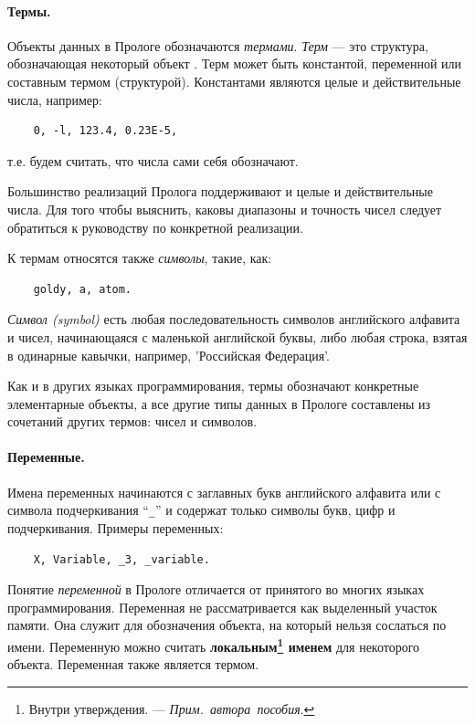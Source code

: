 \documentclass[12pt, openany, twoside]{book} %
\def\AR{{\em Прим.~автора~пособия}}
\begin{document}
\paragraph{Термы.}
Объекты данных в Прологе обозначаются \emph{термами}. {\em Терм} --- это структура, обозначающая некоторый объект  \cite{DDW}. Терм может быть константой, переменной или составным термом (структурой). Константами являются целые и действительные числа, например:
{\tt\begin{verbatim}
    0, -l, 123.4, 0.23E-5,
\end{verbatim}}
\noindent т.е. будем считать, что числа сами себя обозначают.

Большинство реализаций Пролога поддерживают и целые и действительные числа. Для того чтобы выяснить, каковы диапазоны и точность чисел следует обратиться к руководству по конкретной реализации.

К термам относятся также \emph{символы}, такие, как:
{\tt\begin{verbatim}
    goldy, а, atom.
\end{verbatim}}

{\em Символ (symbol)} есть любая последовательность символов английского алфавита и чисел, начинающаяся с маленькой английской буквы, либо любая строка, взятая в одинарные кавычки, например, 'Российская Федерация'.

Как и в других языках программирования, термы обозначают конкретные элементарные объекты, а все другие типы данных в Прологе составлены из сочетаний других термов: чисел и символов.

\paragraph{Переменные.}
Имена переменных начинаются с заглавных букв английского алфавита или с символа подчеркивания ``{\tt \_}'' и содержат только символы букв, цифр и подчеркивания. Примеры переменных:
{\tt\begin{verbatim}
    X, Variable, _3, _variable.
\end{verbatim}}

Понятие \emph{переменной} в Прологе отличается от принятого во многих  языках программирования. Переменная не рассматривается как выделенный участок памяти. Она служит для обозначения объекта, на который нельзя сослаться по имени. Переменную можно считать {\bf локальным\footnote{Внутри утверждения. --- \AR.} именем} для некоторого объекта. Переменная также является термом.
\end{document}

